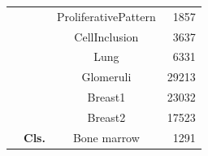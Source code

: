 \documentclass[conference]{IEEEtran}
\begin{document}
\begin{table}[]
{\begin{tabular}{|c|c|cr|}
                                                                  &                                  & ProliferativePattern \cite{mormont2018comparison}                                                                                                              & 1857                                                    \\
                                                                  &                                  & CellInclusion \cite{mormont2018comparison}                                                                                                                     & 3637                                                    \\
                                                                  &                                  & Lung \cite{mormont2018comparison}                                                                                                                              & 6331                                                    \\
                                                                  &                                  & Glomeruli \cite{maree2016approach}                                                                                                                             & 29213                                                   \\
                                                                  &                                  & Breast1 \cite{mormont2018comparison}                                                                                                                           & 23032                                                   \\
                                                                  &                                  & Breast2 \cite{mormont2018comparison}                                                                                                                           & 17523                                                   \\
                                                                  & \multirow{-18}{*}{\textbf{Cls.}} & Bone marrow \cite{maree2016approach}                                                                                                                           & 1291                                                    \\ \cline{2-4} 

\end{tabular}}
\end{table}
\end{document}

